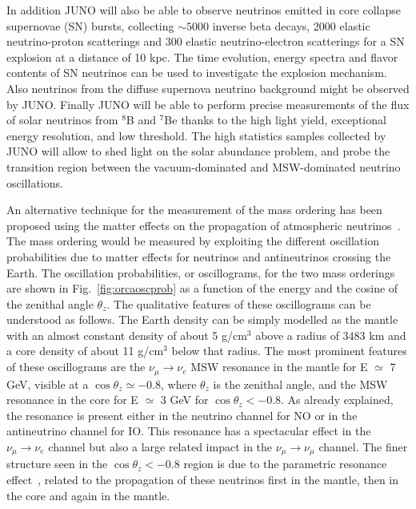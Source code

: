 In addition JUNO will also be able to observe neutrinos emitted in core collapse supernovae (SN) bursts, collecting $\sim5000$ inverse beta decays, 2000 elastic neutrino-proton scatterings and 300 elastic neutrino-electron scatterings for a SN explosion at a distance of 10 kpc. The time evolution, energy spectra and flavor contents of SN neutrinos can be used to investigate the explosion mechanism. Also neutrinos from the diffuse supernova neutrino background might be observed by JUNO. Finally JUNO will be able to perform precise measurements of the flux of solar neutrinos from $^8$B and $^7$Be thanks to the high light yield, exceptional energy resolution, and  low threshold. The high statistics samples collected by JUNO will allow to shed light on the solar abundance problem, and probe the transition region between the vacuum-dominated and MSW-dominated neutrino oscillations. 

An alternative technique for the measurement of the mass ordering has been proposed using the matter effects on the propagation of atmospheric neutrinos~\cite{razzaque}.
The mass ordering would be measured by exploiting the different oscillation probabilities due to matter effects for neutrinos and antineutrinos crossing the Earth. The oscillation probabilities, or oscillograms, for the two mass orderings are shown in Fig.~\ref{fig:orcaoscprob} as a function of the energy and the cosine of the zenithal angle $\theta_z$.
The qualitative features of these oscillograms can be understood as follows. The Earth density can be simply modelled as the mantle with an almost constant density of about 5 g/cm$^3$ above a radius of 3483 km and a core density of about 11 g/cm$^3$ below that radius.
The most prominent features of these oscillograms are the $\nu_\mu \rightarrow \nu_e$ MSW resonance in the mantle for E $\simeq$ 7 GeV, visible at a $\cos \theta_z \simeq -0.8$, where $\theta_z$ is the zenithal angle, and  the MSW resonance in the core for 
  E $\simeq$ 3 GeV for $\cos \theta_z < -0.8$. As already explained, the resonance is present either in the neutrino channel for NO or in the antineutrino channel for IO. This resonance has a spectacular effect in the 
  $\nu_\mu \rightarrow \nu_e$ channel but also a large related impact in the $\nu_\mu \rightarrow \nu_\mu$ channel. The finer structure seen in the $\cos \theta_z < -0.8$ region is due to the parametric resonance effect~\cite{akhmedov}, related to the propagation of these neutrinos first in the mantle, then in the core and again in the mantle. 
  
